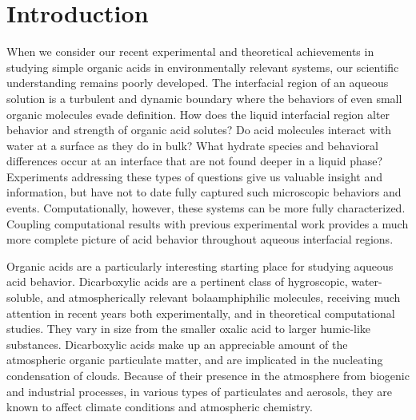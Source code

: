 \section {Introduction}

When we consider our recent experimental and theoretical achievements in studying simple organic acids in environmentally relevant systems, our scientific understanding remains poorly developed. The interfacial region of an aqueous solution is a turbulent and dynamic boundary where the behaviors of even small organic molecules evade definition. How does the liquid interfacial region alter behavior and strength of organic acid solutes? Do acid molecules interact with water at a surface as they do in bulk? What hydrate species and behavioral differences occur at an interface that are not found deeper in a liquid phase? Experiments addressing these types of questions give us valuable insight and information, but have not to date fully captured such microscopic behaviors and events. Computationally, however, these systems can be more fully characterized. Coupling computational results with previous experimental work provides a much more complete picture of acid behavior throughout aqueous interfacial regions.

Organic acids are a particularly interesting starting place for studying aqueous acid behavior. Dicarboxylic acids are a pertinent class of hygroscopic, water-soluble, and atmospherically relevant bolaamphiphilic molecules, receiving much attention in recent years both experimentally,\cite{Peng2001,Kawamura1993,Kawamura1996,Kawamura1996a,Kawamura1999,Senpere1994,Senpere1996,Aggarwal2008,Hsieh2007,Hsieh2009,Pavuluri2010,Nieminen1992,Nahalovsk1970,Dam1983,Mahiuddin2008,Odum1996,Odum1997,Pandis1991,Zhang1992,Hoffmann1997,Hori2003,Bilde2003,Nilsson1998} and in theoretical computational studies.\cite{Darvas2010,Darvas2011,Dlugosz2004,Mohajeri2004,Krijn1988,Chen2000,Nieminen1992,Mahiuddin2008,Ma2011,Nilsson1998} They vary in size from the smaller oxalic acid to larger humic-like substances.\cite{Chebbi1996,Badger2005} Dicarboxylic acids make up an appreciable amount of the atmospheric organic particulate matter, and are implicated in the nucleating condensation of clouds.\cite{Darvas2010,Darvas2011,Cruz1997,Zobrist2006,Hori2003,Shantz2003} Because of their presence in the atmosphere from biogenic and industrial processes, in various types of particulates and aerosols, they are known to affect climate conditions and atmospheric chemistry.\cite{Kanakidou2005,Finlayson-Pitts2000,Seinfeld1998,Darvas2010,Darvas2011,Zobrist2006,Yan2008,Odum1996,Odum1997,Pandis1991,Zhang1992,Hoffmann1997,Hori2003,Kawamura1996a,Bilde2003,Shantz2003} 


